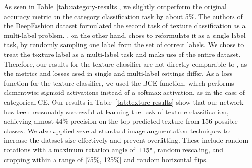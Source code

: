 \begin{table}[H]
	\centering
{}
\hfill
{}
\caption{Evaluation results on test set for our multi-task \textit{DeepFashion} classifier.}
\label{tab:classifier-results}
\end{table}

As seen in Table~\ref{tab:category-results}, we slightly outperform the original accuracy metric on the category classification task by about 5\%. The authors of the DeepFashion dataset formulated the second task of texture classification as a multi-label problem. \cite{tuinhof2018image}, on the other hand, chose to reformulate it as a single label task, by randomly sampling one label from the set of correct labels. We chose to treat the texture label as a multi-label task and make use of the entire dataset. Therefore, our results for the texture classifier are not directly comparable to \cite{tuinhof2018image}, as the metrics and losses used in single and multi-label settings differ. As a loss function for the texture classifier, we used the \ac{BCE} function, which performs elementwise sigmoid activations instead of a softmax activation, as in the case of categorical \ac{CE}. Our results in Table~\ref{tab:texture-results} show that our network has been reasonably successful at learning the task of texture classification, achieving almost 44\% precision on the top predicted texture from 156 possible classes. We also applied several standard image augmentation techniques to increase the dataset size effectively and prevent overfitting. These include random rotations with a maximum rotation angle of $\pm15\degree$, random rescaling, and cropping within a range of [75\%, 125\%] and random horizontal flips.

